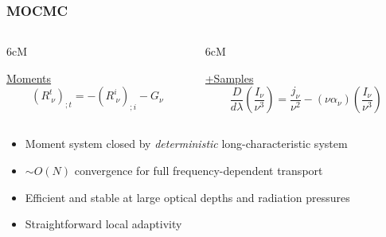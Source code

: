 \documentclass[]{beamer}
\newcommand{\paren}[1]{\left( #1 \right)}
\newcommand{\backupbegin}{
   \newcounter{finalframe}
   \setcounter{finalframe}{\value{framenumber}}
}
\newcommand{\backupend}{
   \setcounter{framenumber}{\value{finalframe}}
}
\begin{document}
\begin{frame}
  \frametitle{MOCMC}
  \begin{columns}
    \begin{column}{6cM}
      \begin{center}
        {\huge\color{blue}\underline{Moments}}
        $$\paren{R^t_{\ \nu}}_{;t} = -\paren{R^i_{\ \nu}}_{;i} - G_\nu$$
      \end{center}
    \end{column}
    \begin{column}{6cM}
      \begin{center}
        {\huge\color{red}\underline{+Samples}}
        $$\frac{D}{d\lambda} \paren{\frac{I_\nu}{\nu^3}} = \frac{j_\nu}{\nu^2} - (\nu \alpha_\nu)\paren{\frac{I_\nu}{\nu^3}} $$
        \end{center}
    \end{column}
  \end{columns}
  \vspace{0.5cm}
  \begin{columns}
    \begin{column}{6cm}
      \begin{itemize}
      \item Moment system closed by \textit{deterministic} long-characteristic system
      \item $\sim O(N)$ convergence for full frequency-dependent transport
      \item Efficient and stable at large optical depths and radiation pressures
      \item Straightforward local adaptivity
      \end{itemize}
    \end{column}
    \begin{column}{6cm}
    \end{column}
  \end{columns}
\end{frame}

\backupbegin
\backupend
\end{document}
